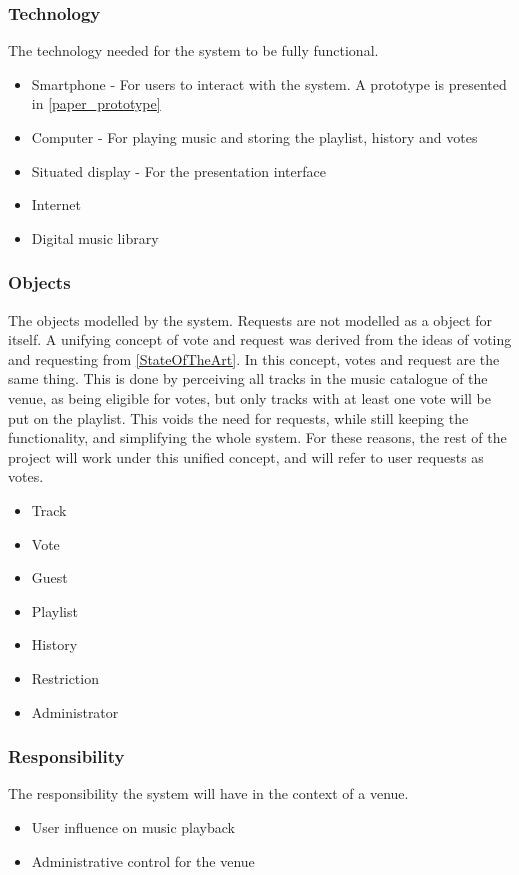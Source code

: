 \subsubsection{Technology}
The technology needed for the system to be fully functional.
\begin{itemize}
    \item Smartphone - For users to interact with the system. A
      prototype is presented in \cref{paper_prototype}
    \item Computer - For playing music and storing the playlist, history and votes
		\item Situated display - For the presentation interface
    \item Internet
    \item Digital music library
\end{itemize}

\subsubsection{Objects}
\label{FACTORObjects}
The objects modelled by the system.
Requests are not modelled as a object for itself. A unifying concept of vote and request was derived from the ideas of voting and requesting from \cref{StateOfTheArt}. In this concept, votes and request are the same thing. This is done by perceiving all tracks in the music catalogue of the venue, as being eligible for votes, but only tracks with at least one vote will be put on the playlist. This voids the need for requests, while still keeping the functionality, and simplifying the whole system. For these reasons, the rest of the project will work under this unified concept, and will refer to user requests as votes.
\begin{itemize}
  \item Track
  \item Vote
  \item Guest
  \item Playlist
  \item History
  \item Restriction
  \item Administrator
\end{itemize}

\subsubsection{Responsibility}
The responsibility the system will have in the context of a venue.
\begin{itemize}
  \item User influence on music playback
  \item Administrative control for the venue
\end{itemize}

